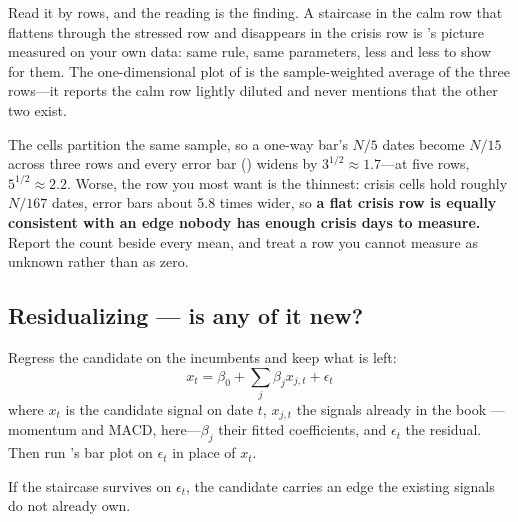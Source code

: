 
Read it by rows, and the reading is the finding. A staircase in the calm row that flattens through
the stressed row and disappears in the crisis row is 's picture measured on
your own data: same rule, same parameters, less and less to show for them. The one-dimensional plot
of  is the sample-weighted average of the three rows---it reports
the calm row lightly diluted and never mentions that the other two exist.

\begin{note}
The cells partition the same sample, so a one-way bar's $N/5$ dates become $N/15$ across three rows
and every error bar () widens by
$3^{1/2} \approx 1.7$---at five rows, $5^{1/2} \approx 2.2$. Worse, the row you most want is the
thinnest: crisis cells hold roughly $N/167$ dates, error bars about 5.8 times wider, so \textbf{a
flat crisis row is equally consistent with an edge nobody has enough crisis days to measure.} Report
the count beside every mean, and treat a row you cannot measure as unknown rather than as zero.
\end{note}

\subsection{Residualizing --- is any of it new?}\label{sec:residualizing}

Regress the candidate on the incumbents and keep what is left:
\[
  x_t = \beta_0 + \sum_j \beta_j x_{j,t} + \epsilon_t
\]
where $x_t$ is the candidate signal on date $t$, $x_{j,t}$ the signals already in the book
---momentum and MACD, here---$\beta_j$ their fitted coefficients, and $\epsilon_t$ the residual.
Then run 's bar plot on $\epsilon_t$ in place of $x_t$.

\begin{claim}\label{clm:residual}
If the staircase survives on $\epsilon_t$, the candidate carries an edge the existing signals do not
already own.
\end{claim}


